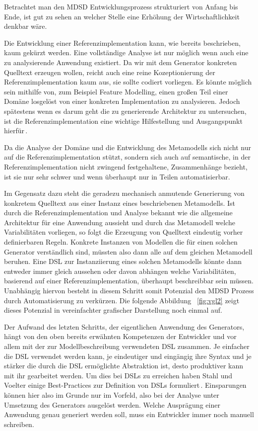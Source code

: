 \documentclass[12pt,oneside,a4paper,parskip]{scrbook}
\begin{document}
Betrachtet man den MDSD Entwicklungsprozess strukturiert von Anfang bis Ende, ist gut zu sehen an welcher Stelle eine Erhöhung der Wirtschaftlichkeit denkbar wäre. 

Die Entwicklung einer Referenzimplementation kann, wie bereits beschrieben, kaum gekürzt werden. Eine vollständige Analyse ist nur möglich wenn auch eine zu analysierende Anwendung existiert. Da wir mit dem Generator konkreten Quelltext erzeugen wollen, reicht auch eine reine Kozeptionierung der Referenzimplementation kaum aus, sie sollte codiert vorliegen. Es könnte möglich sein mithilfe von, zum Beispiel Feature Modelling, einen großen Teil einer Domäne losgelöst von einer konkreten Implementation zu analysieren. Jedoch spätestens wenn es darum geht die zu generierende Architektur zu untersuchen, ist die Referenzimplementation eine wichtige Hilfestellung und Ausgangspunkt hierfür\,\cite[S. 123f.]{stahl2007}.

Da die Analyse der Domäne und die Entwicklung des Metamodells sich nicht nur auf die Referenzimplementation stützt, sondern sich auch auf semantische, in der Referenzimplementation nicht zwingend festgehaltene, Zusammenhänge bezieht, ist sie nur sehr schwer und wenn überhaupt nur in Teilen automatisierbar. 

Im Gegensatz dazu steht die geradezu mechanisch anmutende Generierung von konkretem Quelltext aus einer Instanz eines beschriebenen Metamodells. Ist durch die Referenzimplementation und Analyse bekannt wie die allgemeine Architektur für eine Anwendung aussieht und durch das Metamodell welche Variabilitäten vorliegen, so folgt die Erzeugung von Quelltext eindeutig vorher definierbaren Regeln. Konkrete Instanzen von Modellen die für einen solchen Generator verständlich sind, müssten also dann alle auf dem gleichen Metamodell beruhen. Eine DSL zur Instanziierung eines solchen Metamodells könnte dann entweder immer gleich aussehen oder davon abhängen welche Variabilitäten, basierend auf einer Referenzimplementation, überhaupt beschreibbar sein müssen. Unabhängig hiervon besteht in diesem Schritt somit Potenzial den MDSD Prozess durch Automatisierung zu verkürzen. Die folgende Abbildung ~\ref{fig:vgl2} zeigt dieses Potenzial in vereinfachter grafischer Darstellung noch einmal auf.

Der Aufwand des letzten Schritts, der eigentlichen Anwendung des Generators, hängt von den oben bereits erwähnten Kompetenzen der Entwickler und vor allem mit der zur Modellbeschreibung verwendeten DSL zusammen. Je einfacher die DSL verwendet werden kann, je eindeutiger und eingängig ihre Syntax und je stärker die durch die DSL ermöglichte Abstraktion ist, desto produktiver kann mit ihr gearbeitet werden. Um dies bei DSLs zu erreichen haben Stahl und Voelter einige Best-Practices zur Definition von DSLs formuliert\,\cite[S. 113]{stahl2007}. Einsparungen können hier also im Grunde nur im Vorfeld, also bei der Analyse unter Umsetzung des Generators ausgelöst werden. Welche Ausprägung einer Anwendung genau generiert werden soll, muss ein Entwickler immer noch manuell schreiben.
\end{document}
